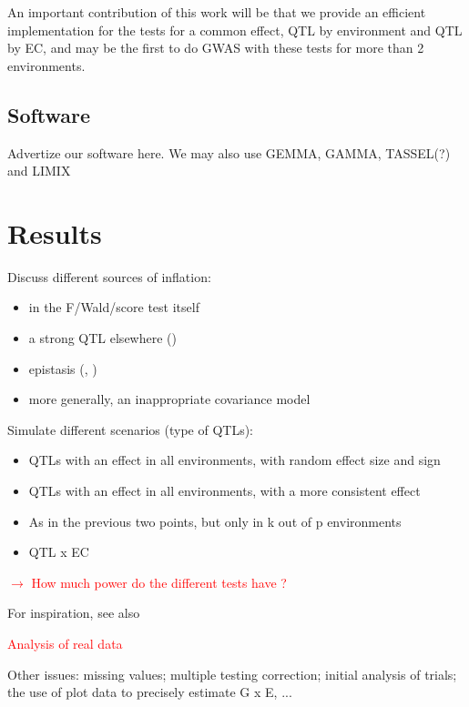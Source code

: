 \documentclass[12pt]{article}
\begin{document}
An important contribution of this work will be that we provide an efficient implementation for the tests for a common effect,  QTL by environment and  QTL by EC, and may be the first to do GWAS with these tests for more than 2 environments.

\subsection{Software}

Advertize our software here. We may also use GEMMA, GAMMA, TASSEL(?) and LIMIX

\section{Results}





Discuss different sources of inflation: 
\begin{itemize}
	\item in the F/Wald/score test itself \cite{zhou_stephens_2014}
	\item a strong QTL elsewhere (\cite{segura_etal_2012})
	\item epistasis (\cite{kruijer_2016}, \cite{millet_etal_2016})
	\item  more generally, an inappropriate covariance model
\end{itemize}







Simulate different scenarios (type of QTLs):
\begin{itemize}
	\item QTLs with an effect in all environments, with random effect size and sign
	\item QTLs with an effect in all environments, with a more consistent effect
	\item As in the previous two points, but only in k out of p environments
	\item QTL x EC
\end{itemize}

\textcolor{red}{$\rightarrow$ How much power do the different tests have ?} 

For inspiration, see also \cite{porter_oreilly_2017_multivariateGWAS}

\textcolor{red}{Analysis of real data}

Other issues: missing values; multiple testing correction; initial analysis of trials; the use of plot data to precisely estimate G x E, ...
 
\end{document}
